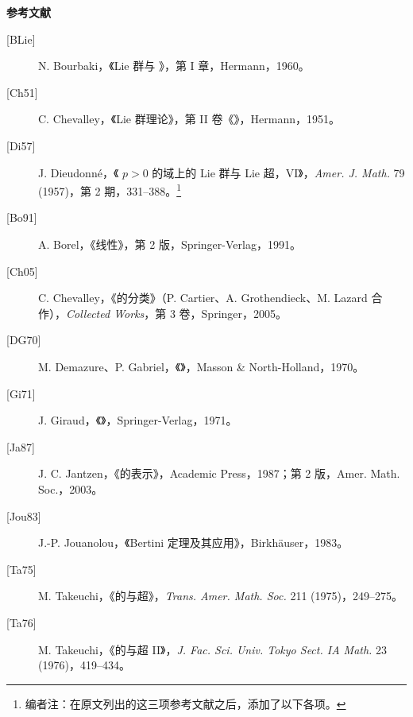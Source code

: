 \textbf{参考文献}
\begin{description}
\item[{[BLie]}] N. Bourbaki，《Lie 群与 》，第 I 章，Hermann，1960。
\item[{[Ch51]}] C. Chevalley，《Lie 群理论》，第 II 卷《》，Hermann，1951。
\item[{[Di57]}] J. Dieudonné，《 $p>0$ 的域上的 Lie 群与 Lie 超，VI》，\textit{Amer. J. Math.} 79 (1957)，第 2 期，331--388。\footnote{编者注：在原文列出的这三项参考文献之后，添加了以下各项。}
\item[{[Bo91]}] A. Borel，《线性》，第 2 版，Springer-Verlag，1991。
\item[{[Ch05]}] C. Chevalley，《的分类》（P. Cartier、A. Grothendieck、M. Lazard 合作），\textit{Collected Works}，第 3 卷，Springer，2005。
\item[{[DG70]}] M. Demazure、P. Gabriel，《》，Masson \& North-Holland，1970。
\item[{[Gi71]}] J. Giraud，《》，Springer-Verlag，1971。
\item[{[Ja87]}] J. C. Jantzen，《的表示》，Academic Press，1987；第 2 版，Amer. Math. Soc.，2003。
\item[{[Jou83]}] J.-P. Jouanolou，《Bertini 定理及其应用》，Birkhäuser，1983。
\item[{[Ta75]}] M. Takeuchi，《的与超》，\textit{Trans. Amer. Math. Soc.} 211 (1975)，249--275。
\item[{[Ta76]}] M. Takeuchi，《的与超 II》，\textit{J. Fac. Sci. Univ. Tokyo Sect. IA Math.} 23 (1976)，419--434。
\end{description}
